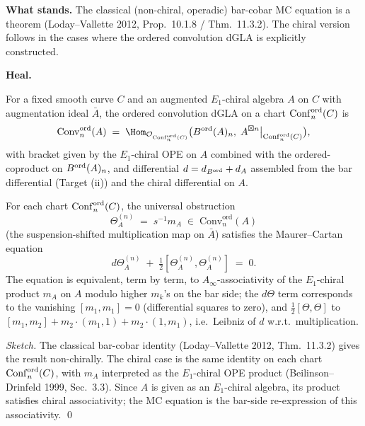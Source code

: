 \textbf{What stands.} The classical (non-chiral, operadic)
bar-cobar MC equation is a theorem (Loday--Vallette 2012, Prop.\ 10.1.8
/ Thm.\ 11.3.2). The chiral version follows in the cases where the
ordered convolution dGLA is explicitly constructed.

\textbf{Heal.}

\begin{definition}
\label{wn:def:opus-ord-conv-dgla}
For a fixed smooth curve $C$ and an augmented $E_1$-chiral algebra $A$
on $C$ with augmentation ideal $\bar A$, the ordered convolution dGLA
on a chart $\mathrm{Conf}_n^{\mathrm{ord}}(C)$ is
\[
\mathrm{Conv}^{\mathrm{ord}}_n(A) \;=\;
\Hom_{\mathcal{O}_{\Conf_n^{\mathrm{ord}}(C)}}
\bigl(\Bord(A)_n, \; A^{\boxtimes n}\big|_{\Conf_n^{\mathrm{ord}}(C)}\bigr),
\]
with bracket given by the $E_1$-chiral OPE on $A$ combined with the
ordered-coproduct on $B^{\mathrm{ord}}(A)_n$, and differential $d = d_{B^{\mathrm{ord}}} +
d_{A}$ assembled from the bar differential (Target (ii)) and the chiral
differential on $A$.
\end{definition}

\begin{proposition}
\label{wn:prop:opus-mc-theorem}\ClaimStatusTheorem
For each chart $\mathrm{Conf}_n^{\mathrm{ord}}(C)$, the universal obstruction
\[
\Theta_A^{(n)} \;=\; s^{-1} m_A \;\in\; \mathrm{Conv}^{\mathrm{ord}}_n(A)
\]
(the suspension-shifted multiplication map on $\bar A$) satisfies the
Maurer--Cartan equation
\[
d \Theta_A^{(n)} \;+\; \tfrac{1}{2} [\Theta_A^{(n)}, \Theta_A^{(n)}]
\;=\; 0.
\]
The equation is equivalent, term by term, to $A_\infty$-associativity
of the $E_1$-chiral product $m_A$ on $A$ modulo higher $m_k$'s on the
bar side; the $d \Theta$ term corresponds to the vanishing $[m_1, m_1]
= 0$ (differential squares to zero), and
$\tfrac{1}{2} [\Theta, \Theta]$ to $[m_1, m_2] + m_2 \cdot (m_1, 1) +
m_2 \cdot (1, m_1)$, i.e.\ Leibniz of $d$ w.r.t.\ multiplication.
\end{proposition}

\begin{proof}[Sketch]
The classical bar-cobar identity (Loday--Vallette 2012, Thm.\ 11.3.2)
gives the result non-chirally. The chiral case is the same identity on
each chart $\mathrm{Conf}_n^{\mathrm{ord}}(C)$, with $m_A$ interpreted as the
$E_1$-chiral OPE product (Beilinson--Drinfeld 1999, Sec.\ 3.3). Since
$A$ is given as an $E_1$-chiral algebra, its product satisfies chiral
associativity; the MC equation is the bar-side
re-expression of this associativity. \qed
\end{proof}

